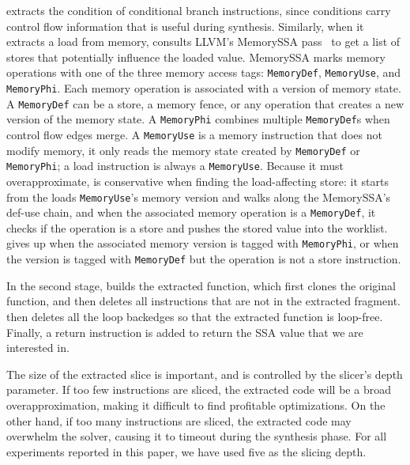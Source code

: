 \tool{} extracts the condition of conditional branch instructions,
since conditions carry control flow information that is useful during
synthesis.
%
Similarly, when it extracts a load from memory, \tool{} consults
LLVM's MemorySSA pass~\cite{MemorySSA} to get a list of stores that
potentially influence the loaded value.
%
MemorySSA marks memory operations with one of the three memory access tags:
\texttt{MemoryDef}, \texttt{MemoryUse}, and \texttt{MemoryPhi}.
Each memory operation is associated with a version of memory state.
%
A \texttt{MemoryDef} can be a store, a memory fence, or any operation
that creates a new version of the memory state.
%
A \texttt{MemoryPhi} combines multiple \texttt{MemoryDef}s when
control flow edges merge.
%
A \texttt{MemoryUse} is a memory instruction that does not modify
memory, it only reads the memory state created by \texttt{MemoryDef}
or \texttt{MemoryPhi}; a load instruction is always a
\texttt{MemoryUse}.
%
Because it must overapproximate, \tool{} is conservative when finding
the load-affecting store: it starts from the loads
\texttt{MemoryUse}'s memory version and walks along the MemorySSA's
def-use chain,
%
and when the associated memory operation is a \texttt{MemoryDef}, it
checks if the operation is a store and pushes the stored value into
the worklist.
%
\tool{} gives up when the associated memory version is tagged with
\texttt{MemoryPhi}, or when the version is tagged with
\texttt{MemoryDef} but the operation is not a store instruction.

In the second stage, \tool{} builds the extracted function, which
first clones the original function, and then deletes all
instructions that are not in the extracted fragment.
%
\tool{} then deletes all the loop backedges so that the extracted
function is loop-free.
%
Finally, a return instruction is added to return the SSA value that we
are interested in.

The size of the extracted slice is important, and is controlled by the
slicer's depth parameter.
%
If too few instructions are sliced, the extracted code will be a broad
overapproximation, making it difficult to find profitable
optimizations.
%
On the other hand, if too many instructions are sliced, the extracted
code may overwhelm the solver, causing it to timeout during the
synthesis phase.
%
For all experiments reported in this paper, we have used five as the
slicing depth.



